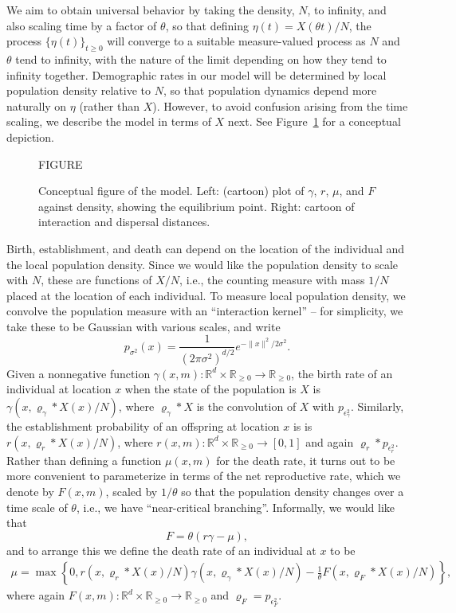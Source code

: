 \documentclass[12pt]{article}
\newcommand{\IR}{\mathbb R}
\newcommand{\kernel}{\varrho}  %
\newcommand{\smooth}[1]{\kernel_{#1} \! * \!}  %
\begin{document}
We aim to obtain universal behavior by taking the density, $N$, to infinity,
and also scaling time by a factor of $\theta$,
so that defining $\eta(t) = X(\theta t) / N$,
the process $\{\eta(t)\}_{t \ge 0}$
will converge to a suitable measure-valued process
as $N$ and $\theta$ tend to infinity,
with the nature of the limit depending on how they tend to infinity together.
Demographic rates in our model
will be determined by local population density relative to $N$,
so that population dynamics depend more naturally on $\eta$ (rather than $X$).
However, to avoid confusion arising from the time scaling,
we describe the model in terms of $X$ next.
See Figure~\ref{fig:model_setup} for a conceptual depiction.

\begin{figure}
    \begin{center}
        FIGURE
    \end{center}
    \caption{
        Conceptual figure of the model.
        Left: (cartoon) plot of $\gamma$, $r$, $\mu$, and $F$ against density,
        showing the equilibrium point.
        Right: cartoon of interaction and dispersal distances.
        \label{fig:model_setup}
    }
\end{figure}

Birth, establishment, and death can depend on the location of the individual
and the local population density.
Since we would like the population density to scale with $N$,
these are functions of $X/N$, i.e.,
the counting measure with mass $1/N$ placed at the location of each individual.
To measure local population density, we convolve the population measure with
an ``interaction kernel'' -- for simplicity, we take these to be Gaussian
with various scales, and write
$$
    p_{\sigma^2}(x) = \frac{1}{(2 \pi \sigma^2)^{d/2}} e^{-\|x\|^2 / 2 \sigma^2} .
$$
Given a nonnegative function $\gamma(x, m) : \IR^d \times \IR_{\ge 0} \to \IR_{\ge 0}$,
the birth rate of an individual at location $x$ when the state of the population is $X$
is $\gamma(x, \smooth{\gamma} X(x) / N)$,
where $\smooth{\gamma} X$ is the convolution of $X$
with $p_{\epsilon_\gamma^2}$.
Similarly, the establishment probability of an offspring at location $x$ is
is $r(x, \smooth{r} X(x) / N)$,
where $r(x, m) : \IR^d \times \IR_{\ge 0} \to [0, 1]$
and again $\smooth{r} p_{\epsilon_r^2}$.
Rather than defining a function $\mu(x, m)$ for the death rate,
it turns out to be more convenient to parameterize in terms of the net reproductive rate,
which we denote by $F(x, m)$,
scaled by $1/\theta$
so that the population density changes over a time scale of $\theta$,
i.e., we have ``near-critical branching''.
Informally, we would like that
$$
    F = \theta (r \gamma - \mu) ,
$$
and to arrange this we define
the death rate of an individual at $x$ to be
\begin{align} \label{eqn:mu_defn}
    \mu
    =
    \max\left\{0, 
        r(x, \smooth{r} X(x) / N) \gamma(x, \smooth{\gamma} X(x) / N)
        - \frac{1}{\theta} F(x, \smooth{F} X(x) / N)
    \right\} ,
\end{align}
where again $F(x, m) : \IR^d \times \IR_{\ge 0} \to \IR_{\ge 0}$
and $\kernel_F = p_{\epsilon_F^2}$.
\end{document}
